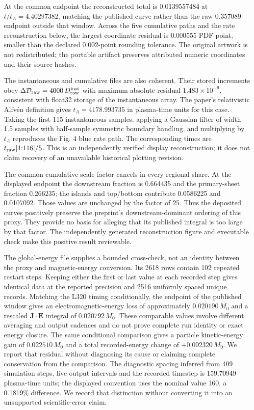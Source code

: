 At the common endpoint the reconstructed total is 0.0139557484 at
\(t/t_A=4.40297382\), matching the published curve rather than the raw
0.357089 endpoint outside that window. Across the five cumulative paths
and the rate reconstruction below, the largest coordinate residual is
0.000555 PDF point, smaller than the declared 0.002-point rounding
tolerance. The original artwork is not redistributed; the portable
artifact preserves attributed numeric coordinates and their source
hashes.

The instantaneous and cumulative files are also coherent. Their stored
increments obey
\(\Delta\mathcal D_{\rm raw}=4000\,D_{\rm raw}^{\rm inst}\) with maximum
absolute residual \(1.483\times10^{-9}\), consistent with float32
storage of the instantaneous array. The paper's relativistic Alfvén
definition gives \(t_A=4178.993735\) in plasma-time units for this case.
Taking the first 115 instantaneous samples, applying a Gaussian filter
of width 1.5 samples with half-sample symmetric boundary handling, and
multiplying by \(t_A\) reproduces the Fig. 4 blue rate path. The
corresponding times are \(t_{\rm raw}[1{:}116]/5\). This is an
independently verified display reconstruction; it does not claim
recovery of an unavailable historical plotting revision.

The common cumulative scale factor cancels in every regional share. At
the displayed endpoint the downstream fraction is 0.664435 and the
primary-sheet fraction 0.266235; the islands and top/bottom contribute
0.0586225 and 0.0107092. Those values are unchanged by the factor of 25.
Thus the deposited curves positively preserve the preprint's
downstream-dominant ordering of this proxy. They provide no basis for
alleging that its published integral is too large by that factor. The
independently generated reconstruction figure and executable check make
this positive result reviewable.

The global-energy file supplies a bounded cross-check, not an identity
between the proxy and magnetic-energy conversion. Its 2618 rows contain
102 repeated restart steps. Keeping either the first or last value at
each recorded step gives identical data at the reported precision and
2516 uniformly spaced unique records. Matching the L320 timing
conditionally, the endpoint of the published window gives an
electromagnetic-energy loss of approximately \(0.020190\,M_0\) and a
rescaled \(\mathbf J\cdot\mathbf E\) integral of \(0.020792\,M_0\).
These comparable values involve different averaging and output cadences
and do not prove complete run identity or exact energy closure. The same
conditional comparison gives a particle kinetic-energy gain of
\(0.022510\,M_0\) and a total recorded-energy change of
\(+0.002320\,M_0\). We report that residual without diagnosing its cause
or claiming complete conservation from the comparison. The diagnostic
spacing inferred from 409 simulation steps, five output intervals and
the recorded timestep is 159.70949 plasma-time units; the displayed
convention uses the nominal value 160, a 0.1819\% difference. We record
that distinction without converting it into an unsupported
scientific-error claim.

